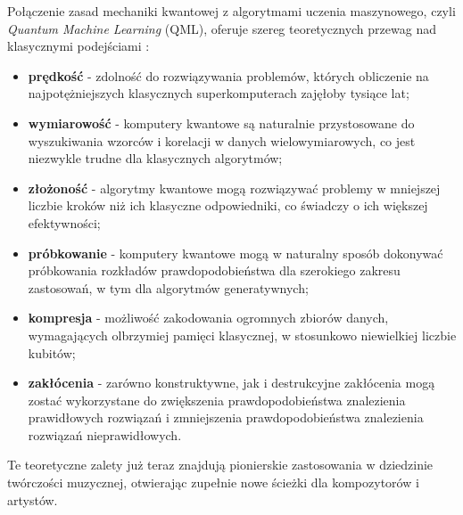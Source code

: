 Połączenie zasad mechaniki kwantowej z algorytmami uczenia maszynowego, czyli \textit{Quantum Machine Learning} (QML), oferuje szereg teoretycznych przewag nad klasycznymi podejściami \cite{ventura1999quantum}:
\begin{itemize}
    \item \textbf{prędkość} - zdolność do rozwiązywania problemów, których obliczenie na najpotężniejszych klasycznych superkomputerach zajęłoby tysiące lat;

    \item \textbf{wymiarowość} - komputery kwantowe są naturalnie przystosowane do wyszukiwania wzorców i korelacji w danych wielowymiarowych, co jest niezwykle trudne dla klasycznych algorytmów;

    \item \textbf{złożoność} - algorytmy kwantowe mogą rozwiązywać problemy w mniejszej liczbie kroków niż ich klasyczne odpowiedniki, co świadczy o ich większej efektywności;

    \item \textbf{próbkowanie} - komputery kwantowe mogą w naturalny sposób dokonywać próbkowania rozkładów prawdopodobieństwa dla szerokiego zakresu zastosowań, w tym dla algorytmów generatywnych;

    \item \textbf{kompresja} - możliwość zakodowania ogromnych zbiorów danych, wymagających olbrzymiej pamięci klasycznej, w stosunkowo niewielkiej liczbie kubitów;

    \item \textbf{zakłócenia} - zarówno konstruktywne, jak i destrukcyjne zakłócenia mogą zostać wykorzystane do zwiększenia prawdopodobieństwa znalezienia prawidłowych rozwiązań i zmniejszenia prawdopodobieństwa znalezienia rozwiązań nieprawidłowych.
\end{itemize}


Te teoretyczne zalety już teraz znajdują pionierskie zastosowania w dziedzinie twórczości muzycznej, otwierając zupełnie nowe ścieżki dla kompozytorów i artystów.

